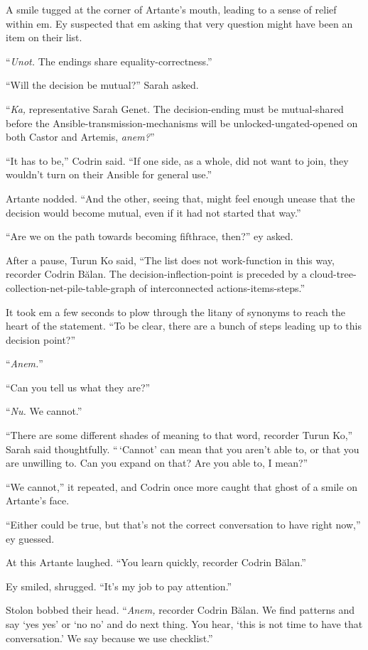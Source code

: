 A smile tugged at the corner of Artante's mouth, leading to a sense of relief within em. Ey suspected that em asking that very question might have been an item on their list.

``\emph{Unot.} The endings share equality-correctness.''

``Will the decision be mutual?'' Sarah asked.

``\emph{Ka,} representative Sarah Genet. The decision-ending must be mutual-shared before the Ansible-transmission-mechanisms will be unlocked-ungated-opened on both Castor and Artemis, \emph{anem?}''

``It has to be,'' Codrin said. ``If one side, as a whole, did not want to join, they wouldn't turn on their Ansible for general use.''

Artante nodded. ``And the other, seeing that, might feel enough unease that the decision would become mutual, even if it had not started that way.''

``Are we on the path towards becoming fifthrace, then?'' ey asked.

After a pause, Turun Ko said, ``The list does not work-function in this way, recorder Codrin Bălan. The decision-inflection-point is preceded by a cloud-tree-collection-net-pile-table-graph of interconnected actions-items-steps.''

It took em a few seconds to plow through the litany of synonyms to reach the heart of the statement. ``To be clear, there are a bunch of steps leading up to this decision point?''

``\emph{Anem.}''

``Can you tell us what they are?''

``\emph{Nu.} We cannot.''

``There are some different shades of meaning to that word, recorder Turun Ko,'' Sarah said thoughtfully. ``\,`Cannot' can mean that you aren't able to, or that you are unwilling to. Can you expand on that? Are you able to, I mean?''

``We cannot,'' it repeated, and Codrin once more caught that ghost of a smile on Artante's face.

``Either could be true, but that's not the correct conversation to have right now,'' ey guessed.

At this Artante laughed. ``You learn quickly, recorder Codrin Bălan.''

Ey smiled, shrugged. ``It's my job to pay attention.''

Stolon bobbed their head. ``\emph{Anem,} recorder Codrin Bălan. We find patterns and say `yes yes' or `no no' and do next thing. You hear, `this is not time to have that conversation.' We say because we use checklist.''

